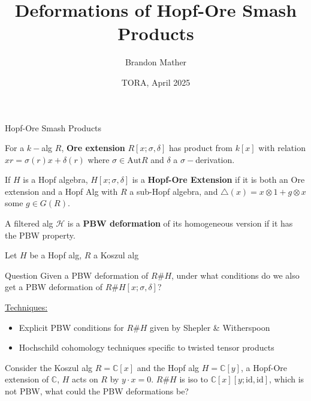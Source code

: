 \documentclass{beamer}
\title{Deformations of Hopf-Ore Smash Products}
\author{Brandon Mather}
\date{TORA, April 2025}
\begin{document}
\maketitle

\begin{frame}{Hopf-Ore Smash Products}
\begin{definition}
    For a \(k-\)alg \(R\), \textbf{Ore extension} \(R[x;\sigma,\delta]\) has product from \(k[x]\) with relation \(xr=\sigma(r)x+\delta(r)\) where \(\sigma\in \text{Aut}R\) and \(\delta\) a \(\sigma-\)derivation. 
\end{definition}
\begin{definition}
    If \(H\) is a Hopf algebra, \(H[x;\sigma,\delta]\) is a \textbf{Hopf-Ore Extension} if it is both an Ore extension and a Hopf Alg with \(R\) a sub-Hopf algebra, and \(\triangle(x)=x\otimes 1+g\otimes x\) some \(g\in G(R)\).
\end{definition}
\begin{definition}
    A filtered alg \(\mathcal{H}\) is a \textbf{PBW deformation} of its homogeneous version if it has the PBW property.
\end{definition}
\end{frame}

\begin{frame} 
    Let \(H\) be a Hopf alg, \(R\) a Koszul alg
\begin{beamerboxesrounded}{Question}
    Given a PBW deformation of \(R\# H\), under what conditions do we also get a PBW deformation of \(R\#H[x;\sigma,\delta]\)?
\end{beamerboxesrounded}

\underline{Techniques:}
\begin{itemize}
    \item Explicit PBW conditions for \(R\#H\) given by Shepler \& Witherspoon
    \item Hochschild cohomology techniques specific to twisted tensor products
\end{itemize}
\begin{example}
    Consider the Koszul alg \(R=\mathbb{C}[x]\) and the Hopf alg \(H=\mathbb{C}[y]\), a Hopf-Ore extension of \(\mathbb{C}\), \(H\) acts on \(R\) by \(y\cdot x=0\).
    \(R\#H\) is iso to \(\mathbb{C}[x][y;\text{id},\text{id}]\), which is not PBW, what could the PBW deformations be?
\end{example}
\end{frame}
\end{document}
